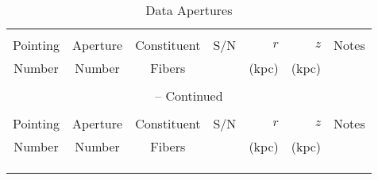 \renewcommand{\thefootnote}{\alph{footnote}}

\begin{center}
\begin{longtable}{cccrrrc}
\caption{Data Apertures} \label{tab:data_ap_full} \\
\hline \hline \\[-2ex]
Pointing &
Aperture &
Constituent &
S/N &
$r$ &
$z$ &
Notes \\
Number &
Number &
Fibers &
 &
(kpc) &
(kpc) & \\[0.5ex] \hline
\\[-1.8ex]
\endfirsthead

\multicolumn{7}{c}{{\tablename} \thetable{} -- Continued} \\[0.5ex]
\hline \hline \\[-2ex]
Pointing &
Aperture &
Constituent &
S/N &
$r$ &
$z$ &
Notes \\
Number &
Number &
Fibers &
 &
(kpc) &
(kpc) & \\[0.5ex] \hline
\\[-1.8ex]
\endhead

\endfoot

\\[-1.8ex] \hline \hline
\endlastfoot


\end{longtable}
\end{center}
